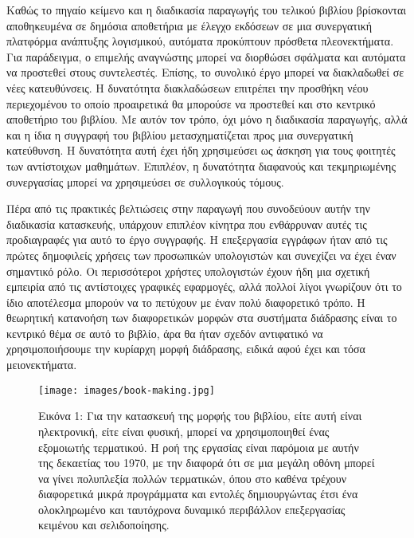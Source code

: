 \documentclass[
]{article}
\begin{document}
Καθώς το πηγαίο κείμενο και η διαδικασία παραγωγής του τελικού βιβλίου
βρίσκονται αποθηκευμένα σε δημόσια αποθετήρια με έλεγχο εκδόσεων σε μια
συνεργατική πλατφόρμα ανάπτυξης λογισμικού, αυτόματα προκύπτουν πρόσθετα
πλεονεκτήματα. Για παράδειγμα, ο επιμελής αναγνώστης μπορεί να διορθώσει
σφάλματα και αυτόματα να προστεθεί στους συντελεστές. Επίσης, το
συνολικό έργο μπορεί να διακλαδωθεί σε νέες κατευθύνσεις. Η δυνατότητα
διακλαδώσεων επιτρέπει την προσθήκη νέου περιεχομένου το οποίο
προαιρετικά θα μπορούσε να προστεθεί και στο κεντρικό αποθετήριο του
βιβλίου. Με αυτόν τον τρόπο, όχι μόνο η διαδικασία παραγωγής, αλλά και η
ίδια η συγγραφή του βιβλίου μετασχηματίζεται προς μια συνεργατική
κατεύθυνση. Η δυνατότητα αυτή έχει ήδη χρησιμεύσει ως άσκηση για τους
φοιτητές των αντίστοιχων μαθημάτων. Επιπλέον, η δυνατότητα διαφανούς και
τεκμηριωμένης συνεργασίας μπορεί να χρησιμεύσει σε συλλογικούς τόμους.

Πέρα από τις πρακτικές βελτιώσεις στην παραγωγή που συνοδεύουν αυτήν την
διαδικασία κατασκευής, υπάρχουν επιπλέον κίνητρα που ενθάρρυναν αυτές
τις προδιαγραφές για αυτό το έργο συγγραφής. Η επεξεργασία εγγράφων ήταν
από τις πρώτες δημοφιλείς χρήσεις των προσωπικών υπολογιστών και
συνεχίζει να έχει έναν σημαντικό ρόλο. Οι περισσότεροι χρήστες
υπολογιστών έχουν ήδη μια σχετική εμπειρία από τις αντίστοιχες γραφικές
εφαρμογές, αλλά πολλοί λίγοι γνωρίζουν ότι το ίδιο αποτέλεσμα μπορούν να
το πετύχουν με έναν πολύ διαφορετικό τρόπο. Η θεωρητική κατανοήση των
διαφορετικών μορφών στα συστήματα διάδρασης είναι το κεντρικό θέμα σε
αυτό το βιβλίο, άρα θα ήταν σχεδόν αντιφατικό να χρησιμοποιήσουμε την
κυρίαρχη μορφή διάδρασης, ειδικά αφού έχει και τόσα μειονεκτήματα.

\leavevmode{}%
\begin{figure}
\hypertarget{fig:book-making}{%
\centering
\texttt{[image: images/book-making.jpg]}
\caption{Εικόνα 1: Για την κατασκευή της μορφής του βιβλίου, είτε αυτή
είναι ηλεκτρονική, είτε είναι φυσική, μπορεί να χρησιμοποιηθεί ένας
εξομοιωτής τερματικού. Η ροή της εργασίας είναι παρόμοια με αυτήν της
δεκαετίας του 1970, με την διαφορά ότι σε μια μεγάλη οθόνη μπορεί να
γίνει πολυπλεξία πολλών τερματικών, όπου στο καθένα τρέχουν διαφορετικά
μικρά προγράμματα και εντολές δημιουργώντας έτσι ένα ολοκληρωμένο και
ταυτόχρονα δυναμικό περιβάλλον επεξεργασίας κειμένου και
σελιδοποίησης.}\label{fig:book-making}
}
\end{figure}
\end{document}
